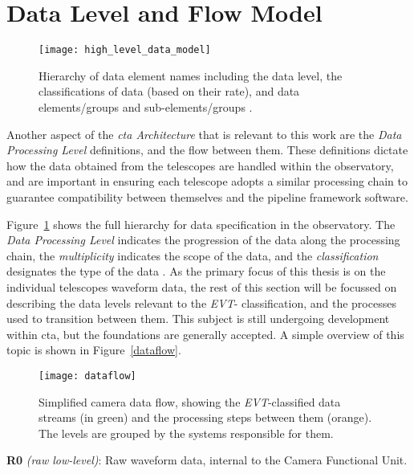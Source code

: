 \section{Data Level and Flow Model}

\begin{figure}
  \centering\texttt{[image: high\_level\_data\_model]} 
	\caption[High-level Data Model Hierarchy]{Hierarchy of data element names including the data level, the classifications of data (based on their rate), and data elements/groups and sub-elements/groups \cite{Kosack2017}.}
	\label{fig:high_level_data_model}
\end{figure}

Another aspect of the \textit{\gls{cta} Architecture} that is relevant to this work are the \textit{Data Processing Level} definitions, and the flow between them. These definitions dictate how the data obtained from the telescopes are handled within the observatory, and are important in ensuring each telescope adopts a similar processing chain to guarantee compatibility between themselves and the pipeline framework software.

Figure~\ref{fig:high_level_data_model} shows the full hierarchy for data specification in the observatory. The \textit{Data Processing Level} indicates the progression of the data along the processing chain, the \textit{multiplicity} indicates the scope of the data, and the \textit{classification} designates the type of the data \cite{Kosack2017}. As the primary focus of this thesis is on the individual telescopes waveform data, the rest of this section will be focussed on describing the data levels relevant to the \textit{EVT}- classification, and the processes used to transition between them. This subject is still undergoing development within \gls{cta}, but the foundations are generally accepted. A simple overview of this topic is shown in Figure~\ref{dataflow}.

\begin{wrapfigure}[36]{r}{0.32\textwidth}
  \texttt{[image: dataflow]}
  \caption{Simplified camera data flow, showing the \textit{EVT}-classified data streams (in green) and
the processing steps between them (orange). The levels are grouped by the systems responsible for them.}\label{fig:dataflow}
\end{wrapfigure}

\textbf{R0} \textit{(raw low-level)}:
Raw waveform data, internal to the Camera Functional Unit.

